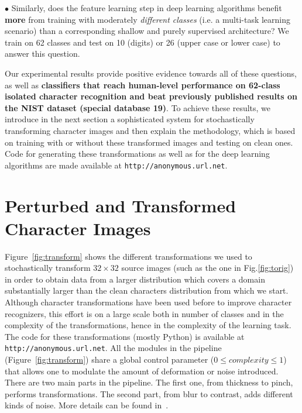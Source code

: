 \documentclass{article} %
\begin{document}
$\bullet$ %
Similarly, does the feature learning step in deep learning algorithms benefit {\bf more}
from training with moderately {\em different classes} (i.e. a multi-task learning scenario) than
a corresponding shallow and purely supervised architecture?
We train on 62 classes and test on 10 (digits) or 26 (upper case or lower case)
to answer this question.

Our experimental results provide positive evidence towards all of these questions,
as well as {\bf classifiers that reach human-level performance on 62-class isolated character
recognition and beat previously published results on the NIST dataset (special database 19)}.
To achieve these results, we introduce in the next section a sophisticated system
for stochastically transforming character images and then explain the methodology,
which is based on training with or without these transformed images and testing on 
clean ones. 
Code for generating these transformations as well as for the deep learning 
algorithms are made available at {\tt http://anonymous.url.net}.%

\section{Perturbed and Transformed Character Images}
\label{s:perturbations}

Figure~\ref{fig:transform} shows the different transformations we used to stochastically
transform $32 \times 32$ source images (such as the one in Fig.\ref{fig:torig})
in order to obtain data from a larger distribution which
covers a domain substantially larger than the clean characters distribution from
which we start.
Although character transformations have been used before to
improve character recognizers, this effort is on a large scale both
in number of classes and in the complexity of the transformations, hence
in the complexity of the learning task.
The code for these transformations (mostly Python) is available at 
{\tt http://anonymous.url.net}. All the modules in the pipeline (Figure~\ref{fig:transform}) share
a global control parameter ($0 \le complexity \le 1$) that allows one to modulate the
amount of deformation or noise introduced. 
There are two main parts in the pipeline. The first one,
from thickness to pinch, performs transformations. The second
part, from blur to contrast, adds different kinds of noise.
More details can be found in~\citep{ift6266-tr-anonymous}.
\end{document}
